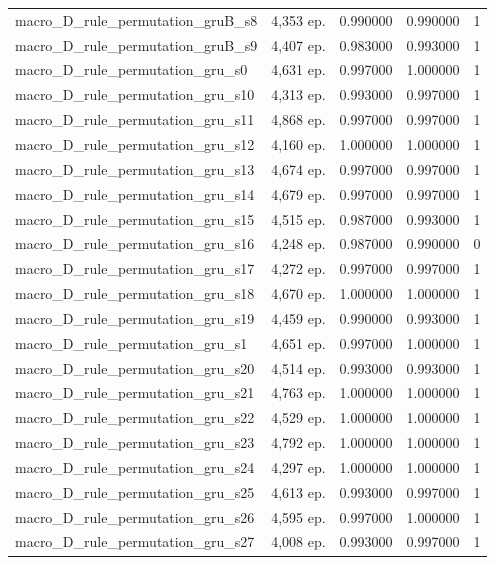 \begin{tabular}{llrrr}
macro\_D\_rule\_permutation\_gruB\_s8 & 4,353 ep. & 0.990000 & 0.990000 & 1 \\
macro\_D\_rule\_permutation\_gruB\_s9 & 4,407 ep. & 0.983000 & 0.993000 & 1 \\
macro\_D\_rule\_permutation\_gru\_s0 & 4,631 ep. & 0.997000 & 1.000000 & 1 \\
macro\_D\_rule\_permutation\_gru\_s10 & 4,313 ep. & 0.993000 & 0.997000 & 1 \\
macro\_D\_rule\_permutation\_gru\_s11 & 4,868 ep. & 0.997000 & 0.997000 & 1 \\
macro\_D\_rule\_permutation\_gru\_s12 & 4,160 ep. & 1.000000 & 1.000000 & 1 \\
macro\_D\_rule\_permutation\_gru\_s13 & 4,674 ep. & 0.997000 & 0.997000 & 1 \\
macro\_D\_rule\_permutation\_gru\_s14 & 4,679 ep. & 0.997000 & 0.997000 & 1 \\
macro\_D\_rule\_permutation\_gru\_s15 & 4,515 ep. & 0.987000 & 0.993000 & 1 \\
macro\_D\_rule\_permutation\_gru\_s16 & 4,248 ep. & 0.987000 & 0.990000 & 0 \\
macro\_D\_rule\_permutation\_gru\_s17 & 4,272 ep. & 0.997000 & 0.997000 & 1 \\
macro\_D\_rule\_permutation\_gru\_s18 & 4,670 ep. & 1.000000 & 1.000000 & 1 \\
macro\_D\_rule\_permutation\_gru\_s19 & 4,459 ep. & 0.990000 & 0.993000 & 1 \\
macro\_D\_rule\_permutation\_gru\_s1 & 4,651 ep. & 0.997000 & 1.000000 & 1 \\
macro\_D\_rule\_permutation\_gru\_s20 & 4,514 ep. & 0.993000 & 0.993000 & 1 \\
macro\_D\_rule\_permutation\_gru\_s21 & 4,763 ep. & 1.000000 & 1.000000 & 1 \\
macro\_D\_rule\_permutation\_gru\_s22 & 4,529 ep. & 1.000000 & 1.000000 & 1 \\
macro\_D\_rule\_permutation\_gru\_s23 & 4,792 ep. & 1.000000 & 1.000000 & 1 \\
macro\_D\_rule\_permutation\_gru\_s24 & 4,297 ep. & 1.000000 & 1.000000 & 1 \\
macro\_D\_rule\_permutation\_gru\_s25 & 4,613 ep. & 0.993000 & 0.997000 & 1 \\
macro\_D\_rule\_permutation\_gru\_s26 & 4,595 ep. & 0.997000 & 1.000000 & 1 \\
macro\_D\_rule\_permutation\_gru\_s27 & 4,008 ep. & 0.993000 & 0.997000 & 1 \\

\end{tabular}
